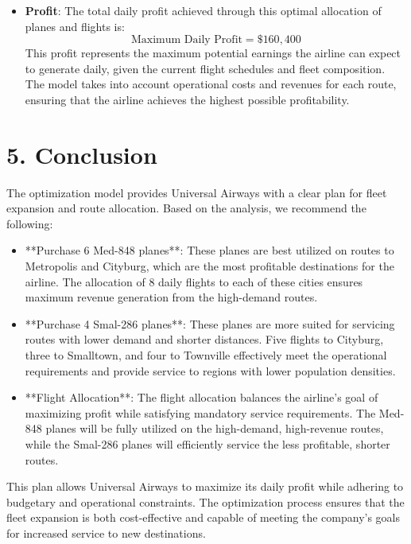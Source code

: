 \begin{itemize}
    \item \textbf{Profit}:
    The total daily profit achieved through this optimal allocation of planes and flights is:
    \[
    \text{Maximum Daily Profit} = \$160,400
    \]
    This profit represents the maximum potential earnings the airline can expect to generate daily, given the current flight schedules and fleet composition. The model takes into account operational costs and revenues for each route, ensuring that the airline achieves the highest possible profitability.
\end{itemize}

\section*{5. Conclusion}

The optimization model provides Universal Airways with a clear plan for fleet expansion and route allocation. Based on the analysis, we recommend the following:

\begin{itemize}
    \item **Purchase 6 Med-848 planes**: These planes are best utilized on routes to Metropolis and Cityburg, which are the most profitable destinations for the airline. The allocation of 8 daily flights to each of these cities ensures maximum revenue generation from the high-demand routes.
    
    \item **Purchase 4 Smal-286 planes**: These planes are more suited for servicing routes with lower demand and shorter distances. Five flights to Cityburg, three to Smalltown, and four to Townville effectively meet the operational requirements and provide service to regions with lower population densities.
    
    \item **Flight Allocation**: The flight allocation balances the airline's goal of maximizing profit while satisfying mandatory service requirements. The Med-848 planes will be fully utilized on the high-demand, high-revenue routes, while the Smal-286 planes will efficiently service the less profitable, shorter routes.
\end{itemize}

This plan allows Universal Airways to maximize its daily profit while adhering to budgetary and operational constraints. The optimization process ensures that the fleet expansion is both cost-effective and capable of meeting the company’s goals for increased service to new destinations.

